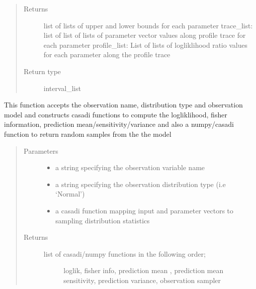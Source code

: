 \documentclass[letterpaper,10pt,english]{sphinxmanual}
\begin{document}
\begin{fulllineitems}
\begin{fulllineitems}
\begin{quote}
\begin{description}
\item[{Returns}] \leavevmode
list of lists of upper and lower bounds for each parameter
trace\_list: list of list of lists of parameter vector values along profile trace for each parameter
profile\_list: List of lists of logliklihood ratio values for each parameter along the profile trace

\item[{Return type}] \leavevmode
interval\_list

\end{description}\end{quote}

\end{fulllineitems}


\begin{fulllineitems}
\label{\detokenize{nloed:nloed.model.Model._get_distribution_functions}}
This function accepts the observation name, distribution type
and observation model and constructs casadi functions to compute
the logliklihood, fisher information, prediction mean/sensitivity/variance
and also a numpy/casadi function to return random samples from the the model
\begin{quote}\begin{description}
\item[{Parameters}] \leavevmode\begin{itemize}
\item {} 
 \textendash{} a string specifying the observation variable name

\item {} 
 \textendash{} a string specifying the observation distribution type (i.e ‘Normal’)

\item {} 
 \textendash{} a casadi function mapping input and parameter vectors to sampling distribution statistics

\end{itemize}

\item[{Returns}] \leavevmode
\begin{description}
\item[{list of casadi/numpy functions in the following order;}] \leavevmode
loglik, fisher info, prediction mean , prediction mean sensitivity,
prediction variance, observation sampler


\end{description}
\end{description}
\end{quote}
\end{fulllineitems}
\end{fulllineitems}
\end{document}
